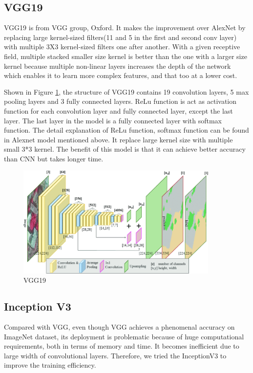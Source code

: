 \documentclass{article}
\begin{document}
\subsection{VGG19}
VGG19 is from VGG group, Oxford. It makes the improvement over AlexNet by replacing large kernel-sized filters(11 and 5 in the first and second conv layer) with multiple 3X3 kernel-sized filters one after another. With a given receptive field, multiple stacked smaller size kernel is better than the one with a larger size kernel because multiple non-linear layers increases the depth of the network which enables it to learn more complex features, and that too at a lower cost. 

Shown in Figure \ref{fig:vgg}, the structure of VGG19\cite{vgg} contains 19 convolution layers, 5 max pooling layers and 3 fully connected layers. ReLu function is act as activation function for each convolution layer and fully connected layer, except the last layer. The last layer in the model is a fully connected layer with softmax function. The detail explanation of ReLu function, softmax function can be found in Alexnet model mentioned above. It replace large kernel size with multiple small 3*3 kernel. The benefit of this model is that it can achieve better accuracy than CNN but takes longer time.

 \begin{figure}[h!]
    \centering
    \includegraphics[width=10cm]{VGG.png}
    \caption{VGG19}
    \label{fig:vgg}
\end{figure}

\subsection{Inception V3}
Compared with VGG, even though VGG achieves a phenomenal accuracy on ImageNet dataset, its deployment is problematic because of huge computational requirements, both in terms of memory and time. It becomes inefficient due to large width of convolutional layers. Therefore, we tried the InceptionV3 to improve the training efficiency.
\end{document}
